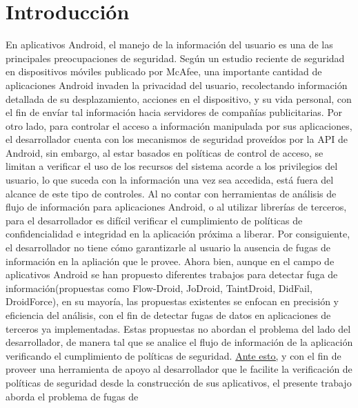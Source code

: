 \label{ch:introduccion}
\chapter{Introducción}
En aplicativos Android, el manejo de la información del usuario es una de las
principales preocupaciones de seguridad. Según un estudio reciente de seguridad
en dispositivos móviles publicado por McAfee\cite{McAfeeReport}, una importante
cantidad de aplicaciones Android invaden la privacidad del usuario, recolectando
información detallada de su desplazamiento, acciones en el dispositivo, y su
vida personal, con el fin de envíar tal información hacia servidores de
compañías publicitarias.\newline 
Por otro lado, para controlar el acceso a información manipulada por sus
aplicaciones, el desarrollador cuenta con los mecanismos de seguridad proveídos
por la API de Android, sin embargo, al estar basados en políticas de control de
acceso, se limitan a verificar el uso de los recursos del sistema acorde a los
privilegios del usuario, lo que suceda con la información una vez sea accedida,
está fuera del alcance de este tipo de controles.\newline 
Al no contar con herramientas de análisis de flujo de información para
aplicaciones Android, o al utilizar librerías de terceros, para el desarrollador
es difícil verificar el cumplimiento de políticas de confidencialidad e
integridad en la aplicación próxima a liberar. Por consiguiente, el
desarrollador no tiene cómo garantizarle al usuario la ausencia de fugas de
información en la apliación que le provee.\newline 
Ahora bien, aunque en el campo de aplicativos Android se han propuesto
diferentes trabajos para detectar fuga de información(propuestas como
Flow-Droid\cite{FlowDroid-Thesis}, JoDroid\cite{JoDroid-Paper},
TaintDroid\cite{TaintDroid}, DidFail\cite{DidFail},
DroidForce\cite{DroidForce}), en su mayoría, las propuestas existentes se
enfocan en precisión y eficiencia del análisis, con el fin de detectar
fugas de datos en aplicaciones de terceros ya implementadas.
Estas propuestas no abordan el problema del lado del desarrollador, de
manera tal que se analice el flujo de información de la aplicación verificando
el cumplimiento de políticas de seguridad.\newline 
\underline{Ante esto,} y con el fin de proveer una herramienta de apoyo al
desarrollador que le facilite la verificación de políticas de seguridad desde la construcción
de sus aplicativos, el presente trabajo aborda el problema de fugas de
